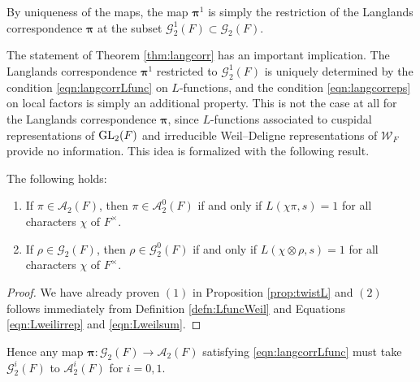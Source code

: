 By uniqueness of the maps, the map $\bm\pi^1$ is simply the restriction of the Langlands correspondence $\bm\pi$ at the subset $\mathcal{G}_2^1(F)\subset\mathcal{G}_2(F)$. 

\begin{rem}
    The statement of Theorem \ref{thm:langcorr} has an important implication. The Langlands correspondence $\bm\pi^1$ restricted to $\mathcal{G}_2^1(F)$ is uniquely determined by the condition \eqref{eqn:langcorrLfunc} on $L$-functions, and the condition \eqref{eqn:langcorreps} on local factors is simply an additional property. This is not the case at all for the Langlands correspondence $\bm\pi$, since $L$-functions associated to cuspidal representations of $\mathrm{GL}_2(F)$ and irreducible Weil--Deligne representations of $\mathcal{W}_F$ provide no information. This idea is formalized with the following result.
    \begin{prop}
        The following holds:
        \begin{enumerate}[(1)]
            \item If $\pi\in\mathcal{A}_2(F)$, then $\pi\in\mathcal{A}_2^0(F)$ if and only if $L(\chi\pi,s)=1$ for all characters $\chi$ of $F^\times$.
            \item If $\rho\in\mathcal{G}_2(F)$, then $\rho\in\mathcal{G}_2^0(F)$ if and only if $L(\chi\otimes\rho,s)=1$ for all characters $\chi$ of $F^\times$.
        \end{enumerate}
    \end{prop}
    \begin{proof}
        We have already proven $(1)$ in Proposition \ref*{prop:twistL} and $(2)$ follows immediately from Definition \ref{defn:LfuncWeil} and Equations \eqref{eqn:Lweilirrep} and \eqref{eqn:Lweilsum}.
    \end{proof}
    Hence any map $\bm\pi:\mathcal{G}_2(F)\longrightarrow\mathcal{A}_2(F)$ satisfying \eqref{eqn:langcorrLfunc} must take $\mathcal{G}_2^i(F)$ to $\mathcal{A}^i_2(F)$ for $i=0,1$. 
\end{rem}

